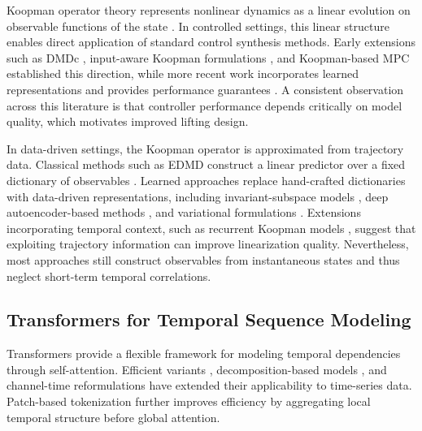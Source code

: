 \documentclass[journal]{IEEEtran}
\begin{document}
Koopman operator theory represents nonlinear dynamics as a linear evolution on observable functions of the state \cite{koopman1931hamiltonian, koopman1932spectra, mezic2005spectral, rowley2009spectral}. In controlled settings, this linear structure enables direct application of standard control synthesis methods. Early extensions such as DMDc \cite{proctor2016dmdc}, input-aware Koopman formulations \cite{proctor2018generalizing, brunton2016invariant}, and Koopman-based MPC \cite{korda2018linear} established this direction, while more recent work incorporates learned representations and provides performance guarantees \cite{han2020deep, shi2022deep, strasser2026overview, duran2025control}. A consistent observation across this literature is that controller performance depends critically on model quality, which motivates improved lifting design.

In data-driven settings, the Koopman operator is approximated from trajectory data. Classical methods such as EDMD construct a linear predictor over a fixed dictionary of observables \cite{williams2015data, williams2015kernel, klus2018data}. Learned approaches replace hand-crafted dictionaries with data-driven representations, including invariant-subspace models \cite{takeishi2017koopman}, deep autoencoder-based methods \cite{lusch2018deep, yeung2019learning}, and variational formulations \cite{morton2019deep, yuan2022variational}. Extensions incorporating temporal context, such as recurrent Koopman models \cite{otto2019linearly, rank2019recurrent}, suggest that exploiting trajectory information can improve linearization quality. Nevertheless, most approaches still construct observables from instantaneous states and thus neglect short-term temporal correlations.

\subsection{Transformers for Temporal Sequence Modeling}

Transformers \cite{vaswani2017attention} provide a flexible framework for modeling temporal dependencies through self-attention. Efficient variants \cite{zhou2021informer, wang2020linformer, katharopoulos2020transformers, choromanski2021performer}, decomposition-based models \cite{wu2021autoformer, zhou2022fedformer}, and channel-time reformulations \cite{zeng2023transformers, liu2024itransformer} have extended their applicability to time-series data. Patch-based tokenization \cite{nie2023time} further improves efficiency by aggregating local temporal structure before global attention.
\end{document}
